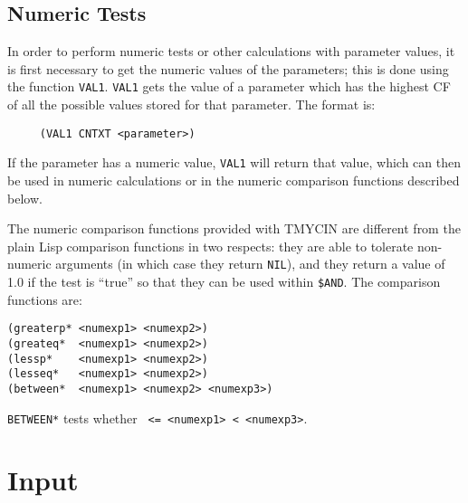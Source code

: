 \subsection{Numeric Tests}

In order to perform numeric tests or other calculations with parameter values,
it is first necessary to get the numeric values of the parameters; this is done
using the function {\tt VAL1}.  {\tt VAL1} gets the value of a parameter which
has the highest CF of all the possible values stored for that parameter.
The format is:

\begin{verbatim}
     (VAL1 CNTXT <parameter>)
\end{verbatim}

If the parameter has a numeric value, {\tt VAL1} will return that value, which
can then be used in numeric calculations or in the numeric comparison functions
described below.

The numeric comparison functions provided with TMYCIN are different from the
plain Lisp comparison functions in two respects: they are able to tolerate
non-numeric arguments (in which case they return {\tt NIL}), and they return
a value of 1.0 if the test is ``true'' so that they can be used within
{\tt \$AND}.  The comparison functions are:

\begin{verbatim}
(greaterp* <numexp1> <numexp2>)
(greateq*  <numexp1> <numexp2>)
(lessp*    <numexp1> <numexp2>)
(lesseq*   <numexp1> <numexp2>)
(between*  <numexp1> <numexp2> <numexp3>)
\end{verbatim}

{\tt BETWEEN*} tests whether {\tt <numexp2> <= <numexp1> < <numexp3>}.

\section{Input}

